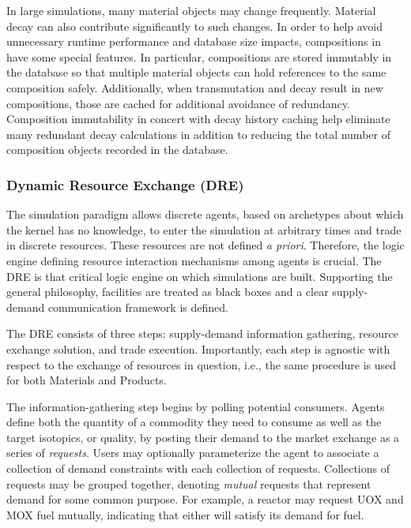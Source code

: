 In large simulations, many material objects may change frequently.  Material
decay can also contribute significantly to such changes.  In order to help
avoid unnecessary runtime performance and database size impacts, compositions
in \Cyclus have some special features.  In particular, compositions are stored
immutably in the database so that multiple material objects can hold references
to the same composition safely.  Additionally, when transmutation and decay
result in new compositions, those are cached for additional avoidance of
redundancy. Composition immutability in concert with decay history caching help
eliminate many redundant decay calculations in addition to reducing the total
number of composition objects recorded in the database.



\subsubsection{Dynamic Resource Exchange (DRE)}

The \Cyclus simulation paradigm allows discrete agents, based on archetypes
about which the kernel has no knowledge, to enter the simulation at arbitrary
times and trade in discrete resources. These resources are not defined \textit{a
  priori}. Therefore, the logic engine defining resource interaction mechanisms
among agents is crucial. The \gls{DRE} is that critical logic engine on which
\Cyclus simulations are built.  Supporting the general \Cyclus philosophy,
facilities are treated as black boxes and a clear supply-demand communication
framework is defined.

The \gls{DRE} consists of three steps: supply-demand information
gathering, resource exchange solution, and trade execution. Importantly, each
step is agnostic with respect to the exchange of resources in question, i.e.,
the same procedure is used for both Materials and Products.

The information-gathering step begins by polling potential consumers. Agents
define both the quantity of a commodity they need to consume as well as the
target isotopics, or quality, by posting their demand to the market exchange as
a series of \textit{requests}. Users may optionally parameterize the agent to
associate a collection of demand constraints with each collection of requests.
Collections of requests may be grouped together, denoting \textit{mutual}
requests that represent demand for
some common purpose. For example, a reactor may request \gls{UOX} and \gls{MOX} fuel
mutually, indicating that either will satisfy its demand for fuel.

